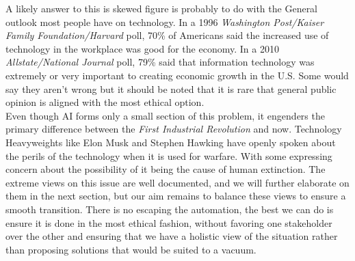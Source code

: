 		A likely answer to this is skewed figure is probably to do with the General outlook most people have on technology. In a 1996 \textit{Washington Post/Kaiser Family Foundation/Harvard} poll, 70\% of Americans said the increased use of technology in the workplace was good for the economy. In a 2010 \textit{Allstate/National Journal} poll, 79\% said that information technology was extremely or very important to creating economic growth in the U.S. Some would say they aren't wrong but it should be noted that it is rare that general public opinion is aligned with the most ethical option.\\
		Even though AI forms only a small section of this problem, it engenders the primary difference between the \textit{First Industrial Revolution} and now. Technology Heavyweights like Elon Musk and Stephen Hawking have openly spoken about the perils of the technology when it is used for warfare\cite{aidangers}. With some expressing concern about the possibility of it being the cause of human extinction. The extreme views on this issue are well documented, and we will further elaborate on them in the next section, but our aim remains to balance these views to ensure a smooth transition. There is no escaping the automation, the best we can do is ensure it is done in the most ethical fashion, without favoring one stakeholder over the other and ensuring that we have a holistic view of the situation rather than proposing solutions that would be suited to a vacuum.
	
